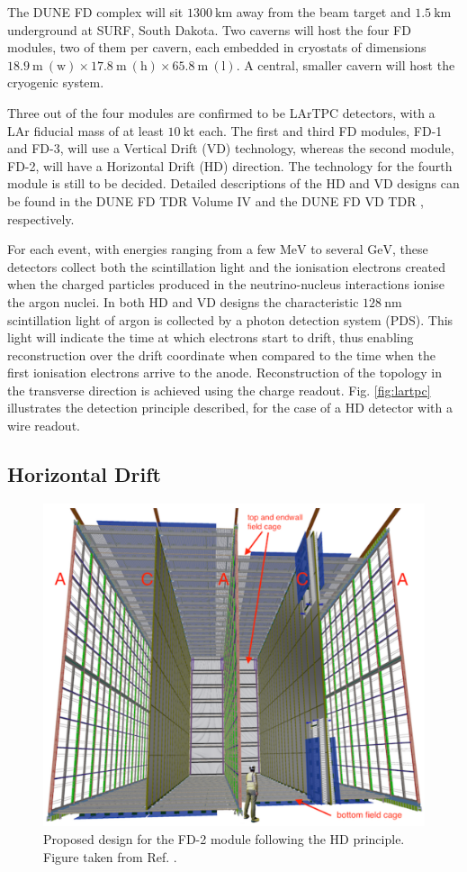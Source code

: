 The DUNE FD complex will sit $1300~\mathrm{km}$ away from the beam target and $1.5~\mathrm{km}$ underground at SURF, South Dakota. Two caverns will host the four FD modules, two of them per cavern, each embedded in cryostats of dimensions $18.9~\mathrm{m} ~ (\text{w}) \times 17.8~\mathrm{m} ~ (\text{h}) \times 65.8~\mathrm{m} ~ (\text{l})$. A central, smaller cavern will host the cryogenic system.

Three out of the four modules are confirmed to be LArTPC detectors, with a LAr fiducial mass of at least $10 ~ \mathrm{kt}$ each. The first and third FD modules, FD-1 and FD-3, will use a Vertical Drift (VD) technology, whereas the second module, FD-2, will have a Horizontal Drift (HD) direction. The technology for the fourth module is still to be decided. Detailed descriptions of the HD and VD designs can be found in the DUNE FD TDR Volume IV \cite{DUNE2020TDR4} and the DUNE FD VD TDR \cite{DUNEVDTDR}, respectively.

For each event, with energies ranging from a few $\mathrm{MeV}$ to several $\mathrm{GeV}$, these detectors collect both the scintillation light and the ionisation electrons created when the charged particles produced in the neutrino-nucleus interactions ionise the argon nuclei. In both HD and VD designs the characteristic $128~\mathrm{nm}$ scintillation light of argon is collected by a photon detection system (PDS). This light will indicate the time at which electrons start to drift, thus enabling reconstruction over the drift coordinate when compared to the time when the first ionisation electrons arrive to the anode. Reconstruction of the topology in the transverse direction is achieved using the charge readout. Fig. \ref{fig:lartpc} illustrates the detection principle described, for the case of a HD detector with a wire readout.

\subsection{Horizontal Drift}

\begin{figure}[t]
	\centering
	\includegraphics[width=0.65\linewidth]{Images/DUNE/FD/dune_hd}
	\caption[Proposed design for the FD-2 module following the HD principle.]{Proposed design for the FD-2 module following the HD principle. Figure taken from Ref. \cite{DUNE2020TDR1}.}
	\label{fig:dune_hd}
\end{figure}

